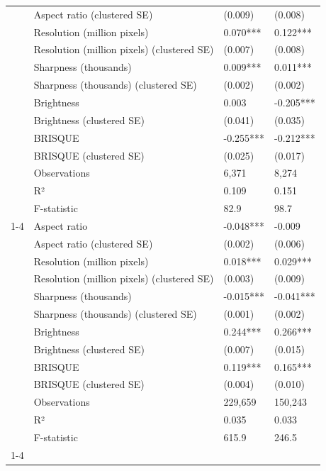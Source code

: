 \begin{tabular}{llll}
 & Aspect ratio (clustered SE) & (0.009) & (0.008) \\
 & Resolution (million pixels) & 0.070*** & 0.122*** \\
 & Resolution (million pixels) (clustered SE) & (0.007) & (0.008) \\
 & Sharpness (thousands) & 0.009*** & 0.011*** \\
 & Sharpness (thousands) (clustered SE) & (0.002) & (0.002) \\
 & Brightness & 0.003 & -0.205*** \\
 & Brightness (clustered SE) & (0.041) & (0.035) \\
 & BRISQUE & -0.255*** & -0.212*** \\
 & BRISQUE (clustered SE) & (0.025) & (0.017) \\
 & Observations & 6,371 & 8,274 \\
 & R² & 0.109 & 0.151 \\
 & F-statistic & 82.9 & 98.7 \\
\cline{1-4}
\multirow[t]{13}{*}{Unfinished probability} & Aspect ratio & -0.048*** & -0.009 \\
 & Aspect ratio (clustered SE) & (0.002) & (0.006) \\
 & Resolution (million pixels) & 0.018*** & 0.029*** \\
 & Resolution (million pixels) (clustered SE) & (0.003) & (0.009) \\
 & Sharpness (thousands) & -0.015*** & -0.041*** \\
 & Sharpness (thousands) (clustered SE) & (0.001) & (0.002) \\
 & Brightness & 0.244*** & 0.266*** \\
 & Brightness (clustered SE) & (0.007) & (0.015) \\
 & BRISQUE & 0.119*** & 0.165*** \\
 & BRISQUE (clustered SE) & (0.004) & (0.010) \\
 & Observations & 229,659 & 150,243 \\
 & R² & 0.035 & 0.033 \\
 & F-statistic & 615.9 & 246.5 \\
\cline{1-4}
\bottomrule
\end{tabular}
